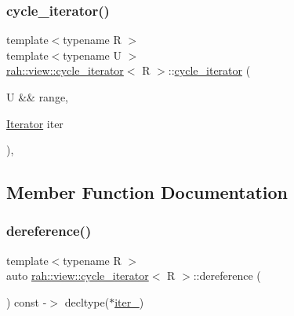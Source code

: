 \subsubsection{\texorpdfstring{cycle\_iterator()}{cycle\_iterator()}}
{\footnotesize\ttfamily template$<$typename R $>$ \\
template$<$typename U $>$ \\
\mbox{\hyperlink{structrah_1_1view_1_1cycle__iterator}{rah\+::view\+::cycle\+\_\+iterator}}$<$ R $>$\+::\mbox{\hyperlink{structrah_1_1view_1_1cycle__iterator}{cycle\+\_\+iterator}} (\begin{DoxyParamCaption}\item[{U \&\&}]{range,  }\item[{\mbox{\hyperlink{structrah_1_1view_1_1cycle__iterator_ac9761016862e6bb26b0ca5e923344b83}{Iterator}}}]{iter }\end{DoxyParamCaption})\hspace{0.3cm}{\ttfamily [inline]}, {\ttfamily [explicit]}}



\subsection{Member Function Documentation}
\mbox{\label{structrah_1_1view_1_1cycle__iterator_a06349419766f9078983fa3db221a3bd8}} 
\subsubsection{\texorpdfstring{dereference()}{dereference()}}
{\footnotesize\ttfamily template$<$typename R $>$ \\
auto \mbox{\hyperlink{structrah_1_1view_1_1cycle__iterator}{rah\+::view\+::cycle\+\_\+iterator}}$<$ R $>$\+::dereference (\begin{DoxyParamCaption}{ }\end{DoxyParamCaption}) const -\/$>$ decltype($\ast$\mbox{\hyperlink{structrah_1_1view_1_1cycle__iterator_a49dea5baf32f7e9bc237b6f534513ada}{iter\+\_\+}}) \hspace{0.3cm}{\ttfamily [inline]}}

\mbox{\label{structrah_1_1view_1_1cycle__iterator_a9e2138807dd1c35fbc202b05fa0dd933}} 
